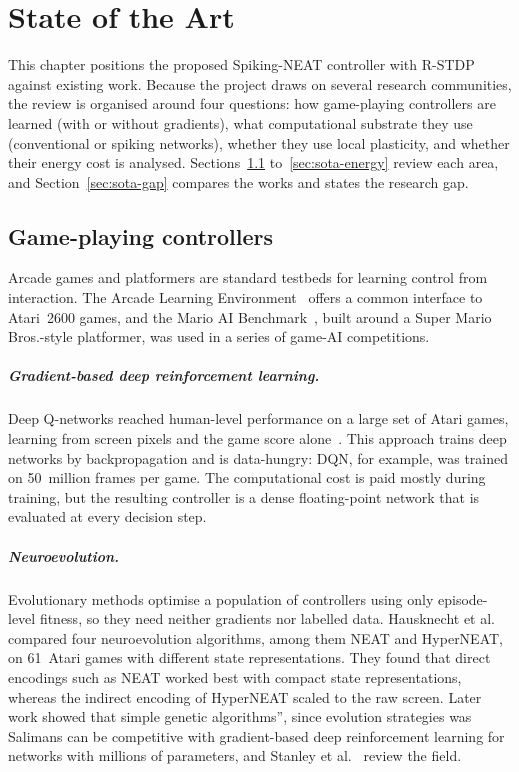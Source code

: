 \chapter{State of the Art}
\label{ch:sota}

This chapter positions the proposed Spiking-NEAT controller with R-STDP against existing work.
Because the project draws on several research communities, the review is organised around four questions: how game-playing controllers are learned (with or without gradients), what computational substrate they use (conventional or spiking networks), whether they use local plasticity, and whether their energy cost is analysed.
Sections~\ref{sec:sota-games} to~\ref{sec:sota-energy} review each area, and Section~\ref{sec:sota-gap} compares the works and states the research gap.

\section{Game-playing controllers}
\label{sec:sota-games}

Arcade games and platformers are standard testbeds for learning control from interaction.
The Arcade Learning Environment~\cite{bellemare2013ale} offers a common interface to Atari~2600 games, and the Mario AI Benchmark~\cite{karakovskiy2012mario}, built around a Super Mario Bros.-style platformer, was used in a series of game-AI competitions.

\paragraph{Gradient-based deep reinforcement learning.}
Deep Q-networks reached human-level performance on a large set of Atari games, learning from screen pixels and the game score alone~\cite{mnih2015human}.
This approach trains deep networks by backpropagation and is data-hungry: DQN, for example, was trained on 50~million frames per game.
The computational cost is paid mostly during training, but the resulting controller is a dense floating-point network that is evaluated at every decision step.

\paragraph{Neuroevolution.}
Evolutionary methods optimise a population of controllers using only episode-level fitness, so they need neither gradients nor labelled data.
Hausknecht et al.~\cite{hausknecht2014atari} compared four neuroevolution algorithms, among them NEAT and HyperNEAT, on 61~Atari games with different state representations.
They found that direct encodings such as NEAT worked best with compact state representations, whereas the indirect encoding of HyperNEAT scaled to the raw screen.
Later work showed that simple genetic algorithms”, since evolution strategies was Salimans can be competitive with gradient-based deep reinforcement learning for networks with millions of parameters, and Stanley et al.~\cite{stanley2019designing} review the field.


